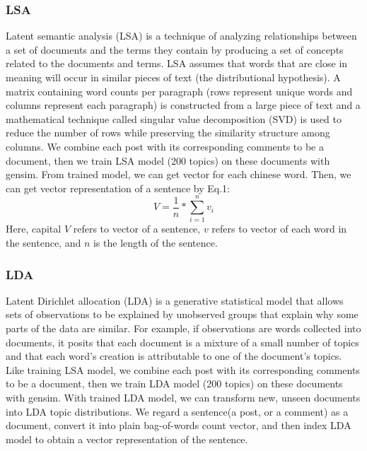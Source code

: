 \documentclass{sig-alternate}
\begin{document}
\subsubsection{LSA}
Latent semantic analysis (LSA) is a technique of analyzing relationships between a set of documents and the terms they contain by producing a set of concepts related to the documents and terms. LSA assumes that words that are close in meaning will occur in similar pieces of text (the distributional hypothesis). A matrix containing word counts per paragraph (rows represent unique words and columns represent each paragraph) is constructed from a large piece of text and a mathematical technique called singular value decomposition (SVD) is used to reduce the number of rows while preserving the similarity structure among columns.\cite{Susan} We combine each post with its corresponding comments to be a document, then we train LSA model (200 topics) on these documents with gensim\footnotemark. From trained model, we can get vector for each chinese word.
Then, we can get vector representation of a sentence by Eq.1:
\begin{equation}
   V = \frac{1}{n} * \sum_{i=1}^n v_i 
\end{equation}
Here, capital $V$ refers to vector of a sentence, $v$ refers to vector of each word in the sentence, and $n$ is the length of the sentence.


\subsubsection{LDA}
Latent Dirichlet allocation (LDA) is a generative statistical model that allows sets of observations to be explained by unobserved groups that explain why some parts of the data are similar. For example, if observations are words collected into documents, it posits that each document is a mixture of a small number of topics and that each word's creation is attributable to one of the document's topics.\cite{David} Like training LSA model, we combine each post with its corresponding comments to be a document, then we train LDA model (200 topics) on these documents with gensim. With trained LDA model, we can transform new, unseen documents into LDA topic distributions. We regard a sentence(a post, or a comment) as a document, convert it into plain bag-of-words count vector, and then index LDA model to obtain a vector representation of the sentence. 
\end{document}
